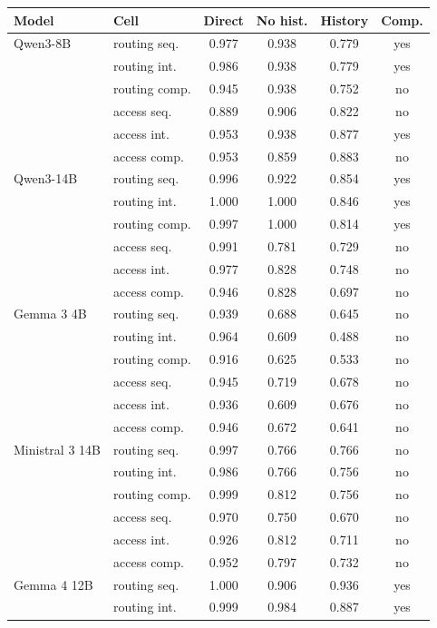 \begin{table}[t]
\centering
\small
\setlength{\tabcolsep}{5pt}
\begin{tabular}{@{}llcccc@{}}
\toprule
Model & Cell & Direct & No hist. & History & Comp. \\
\midrule
Qwen3-8B & routing seq. & 0.977 & 0.938 & 0.779 & yes \\
 & routing int. & 0.986 & 0.938 & 0.779 & yes \\
 & routing comp. & 0.945 & 0.938 & 0.752 & no \\
 & access seq. & 0.889 & 0.906 & 0.822 & no \\
 & access int. & 0.953 & 0.938 & 0.877 & yes \\
 & access comp. & 0.953 & 0.859 & 0.883 & no \\
\midrule
Qwen3-14B & routing seq. & 0.996 & 0.922 & 0.854 & yes \\
 & routing int. & 1.000 & 1.000 & 0.846 & yes \\
 & routing comp. & 0.997 & 1.000 & 0.814 & yes \\
 & access seq. & 0.991 & 0.781 & 0.729 & no \\
 & access int. & 0.977 & 0.828 & 0.748 & no \\
 & access comp. & 0.946 & 0.828 & 0.697 & no \\
\midrule
Gemma 3 4B & routing seq. & 0.939 & 0.688 & 0.645 & no \\
 & routing int. & 0.964 & 0.609 & 0.488 & no \\
 & routing comp. & 0.916 & 0.625 & 0.533 & no \\
 & access seq. & 0.945 & 0.719 & 0.678 & no \\
 & access int. & 0.936 & 0.609 & 0.676 & no \\
 & access comp. & 0.946 & 0.672 & 0.641 & no \\
\midrule
Ministral 3 14B & routing seq. & 0.997 & 0.766 & 0.766 & no \\
 & routing int. & 0.986 & 0.766 & 0.756 & no \\
 & routing comp. & 0.999 & 0.812 & 0.756 & no \\
 & access seq. & 0.970 & 0.750 & 0.670 & no \\
 & access int. & 0.926 & 0.812 & 0.711 & no \\
 & access comp. & 0.952 & 0.797 & 0.732 & no \\
\midrule
Gemma 4 12B & routing seq. & 1.000 & 0.906 & 0.936 & yes \\
 & routing int. & 0.999 & 0.984 & 0.887 & yes \\

\end{tabular}
\end{table}
